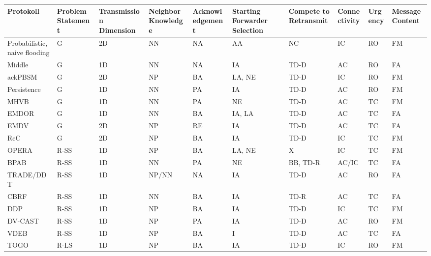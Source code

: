 \documentclass[english,runningheads,a4paper]{llncs}[2018/03/10]
\begin{document}
\begin{table}[]
  \begin{tabular}{llllllllll}
    Protokoll                     & Problem Statement     & Transmission Dimension    & Neighbor Knowledge     & Acknowledgement     & Starting Forwarder Selection    & Compete to Retransmit & Connectivity & Urgency & Message Content \\
    \hline
    Probabilistic, naive flooding & G        & 2D & NN    & NA & AA     & NC       & IC    & RO & FM \\
    Middle                        & G        & 1D & NN    & NA & IA     & TD-D     & AC    & RO & FA \\
    ackPBSM                       & G        & 2D & NP    & BA & LA, NE & TD-D     & IC    & RO & FM \\
    Persistence                   & G        & 1D & NN    & PA & IA     & TD-D     & AC    & RO & FM \\
    MHVB                          & G        & 1D & NN    & PA & NE     & TD-D     & AC    & TC & FM \\
    EMDOR                         & G        & 1D & NN    & BA & IA, LA & TD-D     & AC    & TC & FA \\
    EMDV                          & G        & 2D & NP    & RE & IA     & TD-D     & AC    & TC & FA \\
    ReC                           & G        & 2D & NP    & BA & IA     & TD-D     & IC    & TC & FM \\
    OPERA                         & R-SS     & 1D & NP    & BA & LA, NE & X        & IC    & TC & FM \\
    BPAB                          & R-SS     & 1D & NN    & PA & NE     & BB, TD-R & AC/IC & TC & FA \\
    TRADE/DDT                     & R-SS     & 1D & NP/NN & NA & IA     & TD-D     & AC    & RO & FA \\
    CBRF                          & R-SS     & 1D & NN    & BA & IA     & TD-R     & AC    & TC & FA \\
    DDP                           & R-SS     & 1D & NP    & BA & IA     & TD-D     & IC    & TC & FM \\
    DV-CAST                       & R-SS     & 1D & NP    & PA & IA     & TD-D     & AC    & RO & FM \\
    VDEB                          & R-SS     & 1D & NP    & BA & I      & TD-D     & AC    & TC & FA \\
    TOGO                          & R-LS     & 1D & NP    & BA & IA     & TD-D     & IC    & RO & FM \\

\end{tabular}
\end{table}
\end{document}

